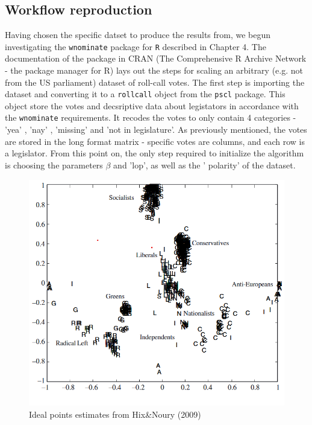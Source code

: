 \documentclass{report}
\begin{document}
            \subsection{Workflow reproduction}
                Having chosen the specific datset to produce the results from, we begun investigating the
                        \texttt{wnominate}
                package for \texttt{R}
                        described in Chapter 4. The documentation of the package in CRAN (The Comprehensive R
                        Archive Network - the package manager for R) lays out the steps for scaling an arbitrary (e.g.
                        not from the US
                        parliament) dataset of roll-call votes. The first step is importing the dataset and converting
                        it to a
                \texttt{rollcall} object from the \texttt{pscl}
                        package. This object store the votes and decsriptive data about
                        legistators in accordance with the \texttt{wnominate}
                        requirements. It recodes the votes to only contain 4
                        categories - 'yea' , 'nay' , 'missing' and 'not in legislature'. As previously mentioned, the
                        votes are stored
                        in the long format matrix - specific votes are columns, and each row is a legislator. From this
                        point on, the
                        only step required to initialize the algorithm is choosing the parameters \( \beta \)
                        and 'lop', as well as the '
                        polarity' of the dataset.

                \begin{figure}[H]
                    \centering
                    \includegraphics[width=1\textwidth]{Graphs/Screenshot 2024-06-09 220607.png}
                    \caption{Ideal points estimates from Hix&Noury (2009)}
                    \label{fig:WNOMINATEHIX6}
                \end{figure}
\end{document}
